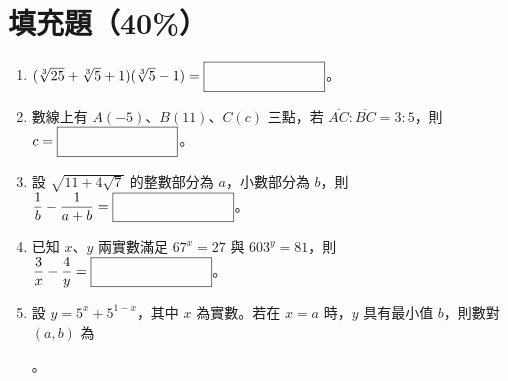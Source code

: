 \documentclass[12pt]{article}
\newcommand*{\blank}[1]{\rule[-.7\baselineskip]{0pt}{1.8\baselineskip}\fbox{\rule[-.4\baselineskip]{0pt}{1.2\baselineskip}\hspace{#1}}}
\newcommand*{\fraction}[2]{\rule[-.7\baselineskip]{0pt}{1.8\baselineskip}\dfrac{#1}{#2}}
\begin{document}
\section{填充題（40\%）}
\begin{enumerate}[label=\Alph*.,align=left,leftmargin=*,labelsep=.6em]
  \item $(\sqrt[3]{25}+\sqrt[3]{5}+1)(\sqrt[3]{5}-1) = \blank{8em}$。
  \item 數線上有 $A(-5)$、$B(11)$、$C(c)$ 三點，若 $\overline{AC}:\overline{BC} = 3:5$，則 $c = \blank{8em}$。
  \item 設 $\sqrt{11+4\sqrt{7}}$ 的整數部分為 $a$，小數部分為 $b$，則 $\fraction{1}{b} - \fraction{1}{a+b} = \blank{8em}$。
  \item 已知 $x$、$y$ 兩實數滿足 $67^x = 27$ 與 $603^y = 81$，則 $\fraction{3}{x} - \fraction{4}{y} = \blank{8em}$。
  \item 設 $y = 5^x + 5^{1-x}$，其中 $x$ 為實數。若在 $x = a$ 時，$y$ 具有最小值 $b$，則數對 $(a, b)$ 為 \blank{8em}。
\end{enumerate}
\end{document}
